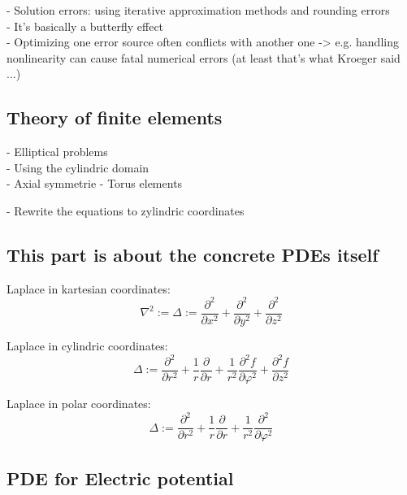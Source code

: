 \documentclass[parskip=half, titlepage=yes, 12pt, BCOR=12mm, DIV=calc]{scrartcl}
\begin{document}
- Solution errors: using iterative approximation methods and rounding errors \\

- It's basically a butterfly effect \\

- Optimizing one error source often conflicts with another one -> e.g. handling nonlinearity can cause fatal numerical errors (at least that's what Kroeger said ...)

\subsection{Theory of finite elements}

- Elliptical problems \\
- Using the cylindric domain \\
- Axial symmetrie 
- Torus elements

- Rewrite the equations to zylindric coordinates \\
 

\subsection{This part is about the concrete PDEs itself}


Laplace in kartesian coordinates:
\begin{equation}
    \nabla^2 := \Delta := \frac{\partial^2}{\partial x^2} + \frac{\partial^2}{\partial y^2} + \frac{\partial^2}{\partial z^2}
\end{equation}

Laplace in cylindric coordinates:
\begin{equation}
    \Delta := \frac{\partial^2}{\partial r^2} + \frac{1}{r} \frac{\partial}{\partial r} + \frac{1}{r^2} \frac{\partial^2 f}{\partial \varphi^2} + \frac{\partial^2 f}{\partial z^2}
\end{equation}

Laplace in polar coordinates:
\begin{equation}
    \Delta := \frac{\partial^2}{\partial r^2} + \frac{1}{r} \frac{\partial}{\partial r} + \frac{1}{r^2} \frac{\partial^2}{\partial \varphi^2}
\end{equation}




\subsection{PDE for Electric potential}
\end{document}
